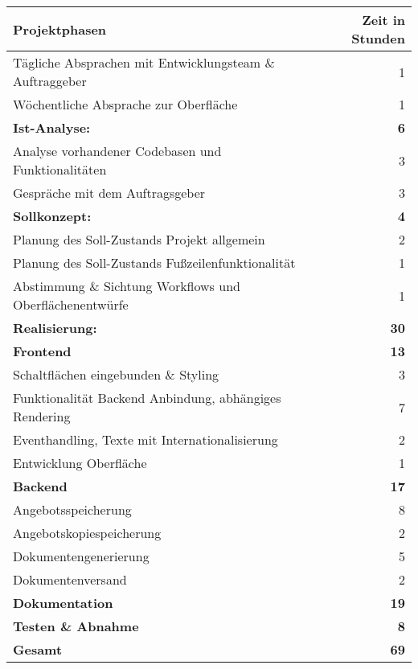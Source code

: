 {
\begin{tabular}{|l|r|}
	\hline
	\textbf{Projektphasen }                                  & \textbf{Zeit in Stunden} \\ \hline
	Tägliche Absprachen mit Entwicklungsteam \& Auftraggeber &                        1 \\
	Wöchentliche Absprache zur Oberfläche                    &                        1 \\
	\textbf{Ist-Analyse: }                                   &               \textbf{6} \\
	Analyse vorhandener Codebasen und Funktionalitäten       &                        3 \\
	Gespräche mit dem Auftragsgeber                          &                        3 \\
	\textbf{Sollkonzept:  }                                  &               \textbf{4} \\
	Planung des Soll-Zustands Projekt allgemein              &                        2 \\
	Planung des Soll-Zustands Fußzeilenfunktionalität        &                        1 \\
	Abstimmung \& Sichtung Workflows und Oberflächenentwürfe &                        1 \\
	\textbf{Realisierung: }                                  &              \textbf{30} \\
	\textbf{Frontend  }                                      &              \textbf{13} \\
	Schaltflächen eingebunden \& Styling                     &                        3 \\
	Funktionalität Backend Anbindung, abhängiges Rendering   &                        7 \\
	Eventhandling, Texte mit Internationalisierung           &                        2 \\
	Entwicklung Oberfläche                                   &                        1 \\
	\textbf{Backend  }                                       &             \textbf{ 17} \\
	Angebotsspeicherung                                      &                        8 \\
	Angebotskopiespeicherung                                 &                        2 \\
	Dokumentengenerierung                                    &                        5 \\
	Dokumentenversand                                        &                        2 \\
	\textbf{Dokumentation }                                  &             \textbf{ 19} \\
	\textbf{Testen \& Abnahme }                              &              \textbf{ 8} \\ \hline
	\textbf{Gesamt}                                          &             \textbf{ 69} \\ \hline
\end{tabular}


}
